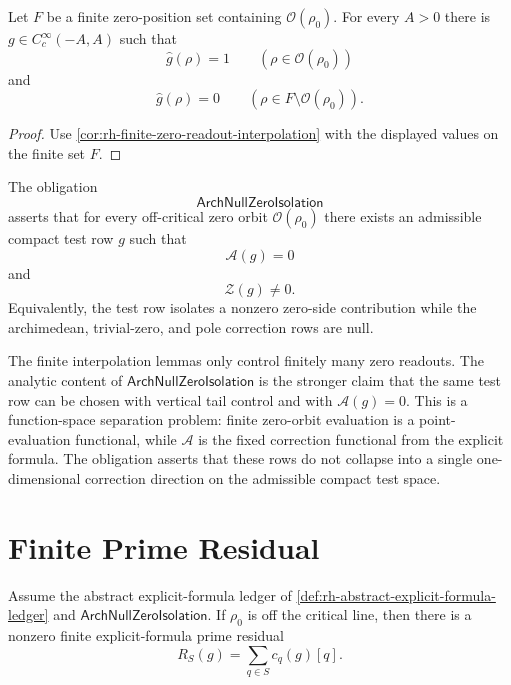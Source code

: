 \begin{lemma}
\label{lem:rh-finite-orbit-isolation}
Let $F$ be a finite zero-position set containing
$\mathcal O(\rho_0)$.  For every $A>0$ there is
$g\in C_c^\infty(-A,A)$ such that
$$
\widehat g(\rho)=1
\qquad
(\rho\in\mathcal O(\rho_0))
$$
and
$$
\widehat g(\rho)=0
\qquad
(\rho\in F\setminus\mathcal O(\rho_0)).
$$
\end{lemma}

\begin{proof}
Use \autoref{cor:rh-finite-zero-readout-interpolation} with the displayed
values on the finite set $F$.
\end{proof}

\begin{definition}[ArchNullZeroIsolation]
\label{def:rh-arch-null-zero-isolation}
The obligation
$$
\mathsf{ArchNullZeroIsolation}
$$
asserts that for every off-critical zero orbit
$\mathcal O(\rho_0)$ there exists an admissible compact test row $g$ such
that
$$
\mathcal A(g)=0
$$
and
$$
\mathcal Z(g)\ne0.
$$
Equivalently, the test row isolates a nonzero zero-side contribution
while the archimedean, trivial-zero, and pole correction rows are null.
\end{definition}

\begin{principle}
\label{prin:rh-analytic-content-of-arch-null-isolation}
The finite interpolation lemmas only control finitely many zero readouts.
The analytic content of $\mathsf{ArchNullZeroIsolation}$ is the stronger
claim that the same test row can be chosen with vertical tail control and
with $\mathcal A(g)=0$.  This is a function-space separation problem:
finite zero-orbit evaluation is a point-evaluation functional, while
$\mathcal A$ is the fixed correction functional from the explicit
formula.  The obligation asserts that these rows do not collapse into a
single one-dimensional correction direction on the admissible compact
test space.
\end{principle}

\section{Finite Prime Residual}
\label{sec:rh-explicit-formula-finite-prime-residual}

\begin{theorem}
\label{thm:rh-explicit-formula-scale-residual-from-arch-null-isolation}
Assume the abstract explicit-formula ledger of
\autoref{def:rh-abstract-explicit-formula-ledger} and
$\mathsf{ArchNullZeroIsolation}$.  If $\rho_0$ is off the critical line,
then there is a nonzero finite explicit-formula prime residual
$$
R_S(g)=\sum_{q\in S}c_q(g)[q].
$$
\end{theorem}

